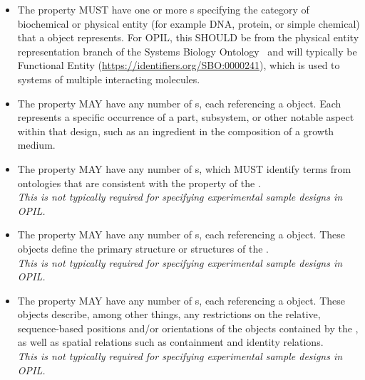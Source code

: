 \begin{itemize}
\item \label{sec:sbol:type:C}
The  property MUST have one or more s specifying the category of biochemical or physical entity (for example DNA, protein, or simple chemical) that a  object represents.
For OPIL, this SHOULD be from the physical entity representation branch of the Systems Biology Ontology~\citep{SBO}
and will typically be Functional Entity (\url{https://identifiers.org/SBO:0000241}), which is used to systems of multiple interacting molecules.

\item \label{sec:sbol:hasFeature}
The  property MAY have any number of s, each referencing a  object. Each  represents a specific occurrence of a part, subsystem, or other notable aspect within that design, such as an ingredient in the composition of a growth medium.

\item \label{sec:sbol:role:C}
The  property MAY have any number of s, which MUST identify terms from ontologies that are consistent with the  property of the . 
\\{\em This is not typically required for specifying experimental sample designs in OPIL.}

\item \label{sec:sbol:hasSequence:C}
The  property MAY have any number of s, each referencing a  object.  These objects define the primary structure or structures of the .
\\{\em This is not typically required for specifying experimental sample designs in OPIL.}

\item \label{sec:sbol:hasConstraint}
The  property MAY have any number of s, each referencing a  object.
These objects describe, among other things, any restrictions on the relative, sequence-based positions and/or orientations of the  objects contained by the , as well as spatial relations such as containment and identity relations.
\\{\em This is not typically required for specifying experimental sample designs in OPIL.}


\end{itemize}
